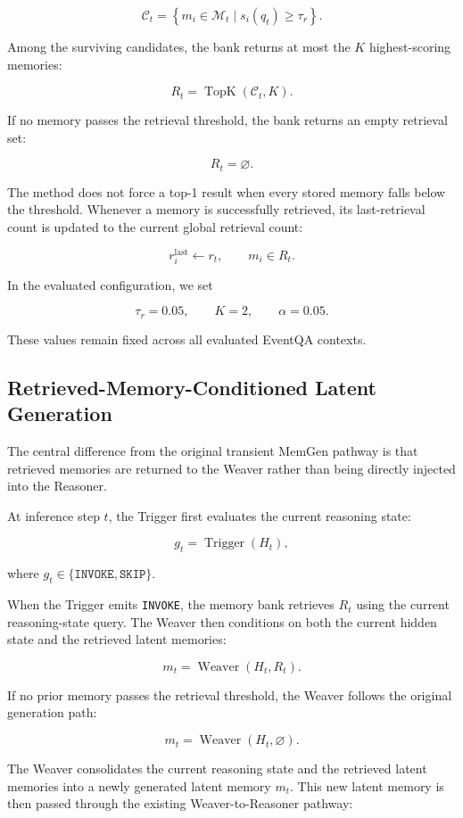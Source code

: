 \[
\mathcal{C}_t =
\left\{
m_i\in\mathcal{M}_t
\mid
s_i(q_t)\geq\tau_r
\right\}.
\]

Among the surviving candidates, the bank returns at most the $K$ highest-scoring memories:

\[
R_t =
\operatorname{TopK}\left(\mathcal{C}_t,K\right).
\]

If no memory passes the retrieval threshold, the bank returns an empty retrieval set:

\[
R_t=\varnothing.
\]

The method does not force a top-1 result when every stored memory falls below the threshold. Whenever a memory is successfully retrieved, its last-retrieval count is updated to the current global retrieval count:

\[
r_i^{\mathrm{last}}\leftarrow r_t,
\qquad
m_i\in R_t.
\]

In the evaluated configuration, we set

\[
\tau_r=0.05,
\qquad
K=2,
\qquad
\alpha=0.05.
\]

These values remain fixed across all evaluated EventQA contexts.

\subsection{Retrieved-Memory-Conditioned Latent Generation}

The central difference from the original transient MemGen pathway is that retrieved memories are returned to the Weaver rather than being directly injected into the Reasoner.

At inference step $t$, the Trigger first evaluates the current reasoning state:

\[
g_t=\operatorname{Trigger}(H_t),
\]

where $g_t\in\{\texttt{INVOKE},\texttt{SKIP}\}$.

When the Trigger emits \texttt{INVOKE}, the memory bank retrieves $R_t$ using the current reasoning-state query. The Weaver then conditions on both the current hidden state and the retrieved latent memories:

\[
m_t =
\operatorname{Weaver}(H_t,R_t).
\]

If no prior memory passes the retrieval threshold, the Weaver follows the original generation path:

\[
m_t =
\operatorname{Weaver}(H_t,\varnothing).
\]

The Weaver consolidates the current reasoning state and the retrieved latent memories into a newly generated latent memory $m_t$. This new latent memory is then passed through the existing Weaver-to-Reasoner pathway:

